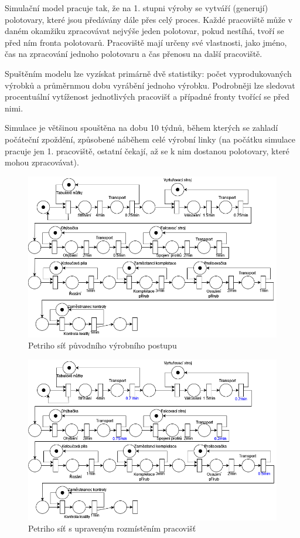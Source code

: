 \documentclass[11pt, a4paper]{article}
\begin{document}
Simulační model pracuje tak, že na 1. stupni výroby se vytváří (generují) polotovary, které jsou předávány dále přes celý proces. Každé pracoviště může v daném okamžiku zpracovávat nejvýše jeden polotovar, pokud nestíhá, tvoří se před ním fronta polotovarů. Pracoviště mají určeny své vlastnosti, jako jméno, čas na zpracování jednoho polotovaru a čas přenosu na další pracoviště.

Spuštěním modelu lze vyzískat primárně dvě statistiky: počet vyprodukovaných výrobků a průměrnmou dobu vyrábění jednoho výrobku. Podrobněji lze sledovat procentuální vytíženost jednotlivých pracovišť a případné fronty tvořící se před nimi.

Simulace je většinou spouštěna na dobu\cite[str. 21]{ims} 10 týdnů, během kterých se zahladí počáteční zpoždění, způsobené náběhem celé výrobní linky (na počátku simulace pracuje jen 1. pracoviště, ostatní čekají, až se k nim dostanou polotovary, které mohou zpracovávat).


\begin{figure}[H]
    \centering
    \includegraphics[width=17cm]{orig}
    \caption{Petriho síť\cite[str. 123]{ims} původního výrobního postupu}
    \label{orig}
\end{figure}

\begin{figure}[H]
    \centering
    \includegraphics[width=17cm]{casy}
    \caption{Petriho síť s upraveným  rozmístěním pracovišť}
    \label{orig}
\end{figure}
\end{document}
